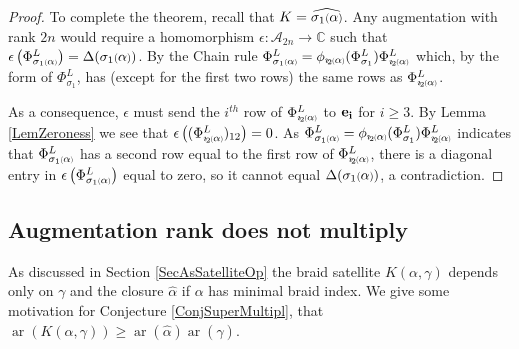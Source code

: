 \documentclass[11pt]{amsart}
\def\s{{\sigma}}
\def\ar{\operatorname{ar}}
\newcommand*{\smallp}[1]{\scalebox{.75}{\ensuremath#1}}
\newcommand*{\subsmallp}[1]{\scalebox{.5}{\ensuremath#1}}
\newcommand{\subpp}[2][p]{\imath_{\hspace*{-1pt}#1}\hspace*{-.5pt}\subsmallp(#2\subsmallp)}
\theoremstyle{definition}
\begin{document}
\begin{proof}
To complete the theorem, recall that $K=\widehat{\s_1\smallp(\alpha\smallp)}$. Any augmentation with rank $2n$ would require a homomorphism $\epsilon: \mathcal A_{2n}\to\mathbb C$ such that $\epsilon\left(\Phi_{\s_1\subsmallp(\alpha\subsmallp)}^L\right) = \Delta(\s_1\smallp(\alpha\smallp))$. By the Chain rule $\Phi_{\s_1\subsmallp(\alpha\subsmallp)}^L = \phi_{\subpp[2]\alpha}(\Phi_{\s_1}^L)\Phi_{\subpp[2]\alpha}^L$ which, by the form of $\Phi_{\s_1}^L$, has (except for the first two rows) the same rows as $\Phi_{\subpp[2]\alpha}^L$.

As a consequence, $\epsilon$ must send the $i^{th}$ row of $\Phi_{\subpp[2]\alpha}^L$ to ${\bf e_i}$ for $i\ge 3$. By Lemma \ref{LemZeroness} we see that $\epsilon\left((\Phi_{\subpp[2]\alpha}^L)_{12}\right) = 0$. As $\Phi_{\s_1\subsmallp(\alpha\subsmallp)}^L = \phi_{\subpp[2]\alpha}(\Phi_{\s_1}^L)\Phi_{\subpp[2]\alpha}^L$ indicates that $\Phi_{\s_1\subsmallp(\alpha\subsmallp)}^L$ has a second row equal to the first row of $\Phi_{\subpp[2]\alpha}^L$, there is a diagonal entry in $\epsilon\left(\Phi_{\s_1\subsmallp(\alpha\subsmallp)}^L\right)$ equal to zero, so it cannot equal $\Delta(\s_1\smallp(\alpha\smallp))$, a contradiction.
\end{proof}

\subsection{Augmentation rank does not multiply}
\label{SecMultiplic}

As discussed in Section \ref{SecAsSatelliteOp} the braid satellite $K(\alpha,\gamma)$ depends only on $\gamma$ and the closure $\hat{\alpha}$ if $\alpha$ has minimal braid index. We give some motivation for Conjecture \ref{ConjSuperMultipl}, that $\ar(K(\alpha,\gamma))\ge \ar(\hat{\alpha})\ar(\hat{\gamma})$.
\end{document}
